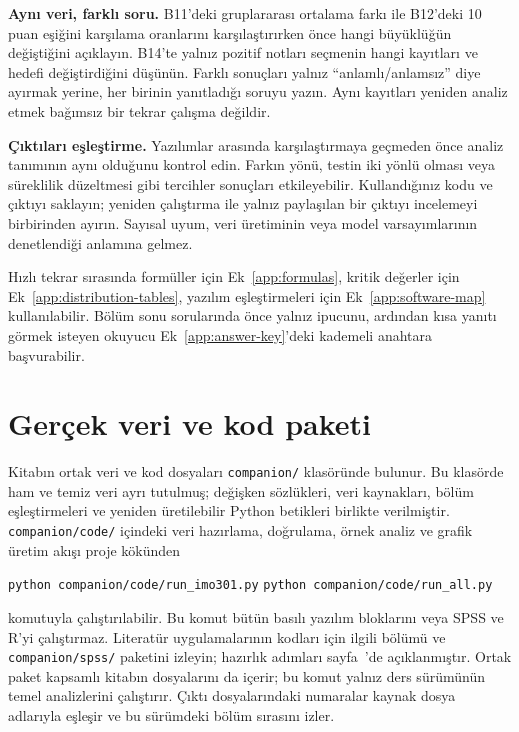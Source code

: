 \textbf{Aynı veri, farklı soru.} B11'deki gruplararası ortalama farkı ile
B12'deki 10 puan eşiğini karşılama oranlarını karşılaştırırken önce hangi
büyüklüğün değiştiğini açıklayın. B14'te yalnız pozitif notları seçmenin
hangi kayıtları ve hedefi değiştirdiğini düşünün. Farklı sonuçları yalnız
``anlamlı/anlamsız'' diye ayırmak yerine, her birinin yanıtladığı soruyu
yazın. Aynı kayıtları yeniden analiz etmek bağımsız bir tekrar çalışma
değildir.

\textbf{Çıktıları eşleştirme.} Yazılımlar arasında karşılaştırmaya geçmeden
önce analiz tanımının aynı olduğunu kontrol edin. Farkın yönü, testin iki
yönlü olması veya süreklilik düzeltmesi gibi tercihler sonuçları
etkileyebilir. Kullandığınız kodu ve çıktıyı saklayın; yeniden çalıştırma
ile yalnız paylaşılan bir çıktıyı incelemeyi birbirinden ayırın.
Sayısal uyum, veri üretiminin veya model varsayımlarının denetlendiği
anlamına gelmez.

Hızlı tekrar sırasında formüller için Ek~\ref{app:formulas}, kritik değerler
için Ek~\ref{app:distribution-tables}, yazılım eşleştirmeleri için
Ek~\ref{app:software-map} kullanılabilir. Bölüm sonu sorularında önce yalnız
ipucunu, ardından kısa yanıtı görmek isteyen okuyucu Ek~\ref{app:answer-key}'deki
kademeli anahtara başvurabilir.

\section*{Gerçek veri ve kod paketi}

Kitabın ortak veri ve kod dosyaları \texttt{companion/} klasöründe bulunur.
Bu klasörde ham ve temiz veri ayrı tutulmuş; değişken sözlükleri, veri
kaynakları, bölüm eşleştirmeleri ve yeniden üretilebilir Python betikleri
birlikte verilmiştir. \texttt{companion/code/} içindeki veri hazırlama,
doğrulama, örnek analiz ve grafik üretim akışı proje kökünden
\begin{center}
\ifimoders
\texttt{python companion/code/run\_imo301.py}
\else
\texttt{python companion/code/run\_all.py}
\fi
\end{center}
komutuyla çalıştırılabilir. Bu komut bütün basılı yazılım bloklarını veya
SPSS ve R'yi çalıştırmaz. Literatür uygulamalarının kodları için ilgili
bölümü ve \texttt{companion/spss/} paketini izleyin; hazırlık adımları
sayfa~\pageref{sec:spss-guide}'de açıklanmıştır.
\ifimoders
Ortak paket kapsamlı kitabın dosyalarını da içerir; bu komut yalnız ders
sürümünün temel analizlerini çalıştırır. Çıktı dosyalarındaki numaralar
kaynak dosya adlarıyla eşleşir ve bu sürümdeki bölüm sırasını izler.
\fi

